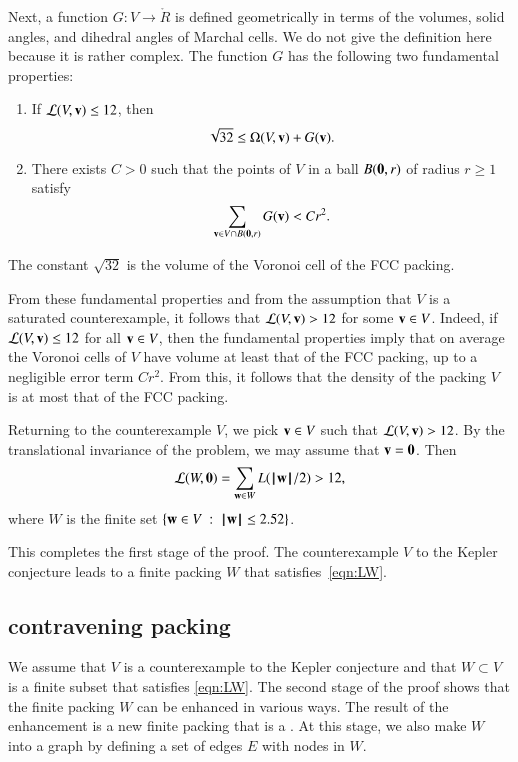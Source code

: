 Next, a function $G:V\to \ring{R}$ is defined geometrically in terms
of the volumes, solid angles, and dihedral angles of Marchal cells.
We do not give the definition here because it is rather
complex.  The function $G$ has the following two fundamental
properties:
\begin{enumerate}
\item If ${\mathcal L}(V,{\mathbf v})\le 12$, then 
\[
\sqrt{32}\le \Omega(V,{\mathbf v}) +G({\mathbf v}).
\]
\item There exists $C>0$ such that the points of $V$ in a ball $B({\mathbf 0},r)$
of radius $r\ge 1$ satisfy
\[
\sum_{{\mathbf v}\in V \cap B({\mathbf 0},r)} G({\mathbf v}) < C r^2.
\]
\end{enumerate}
The constant $\sqrt{32}$ is the volume of the Voronoi cell of the FCC packing.

From these fundamental properties and from the assumption that $V$ is a saturated counterexample,
it follows that ${\mathcal L}(V,{\mathbf v})>12$ for some ${\mathbf v}\in V$.  Indeed, if ${\mathcal L}(V,{\mathbf v})\le 12$ for all
${\mathbf v}\in V$, then the fundamental properties
imply that on average the Voronoi cells of $V$ have volume at least that of the FCC packing, up to a negligible error term $C r^2$.  From this, it follows that the density
of the packing $V$ is at most that of the FCC packing.



Returning to the counterexample $V$, we pick ${\mathbf v}\in V$ such that
${\mathcal L}(V,{\mathbf v})>12$.  By the translational invariance of the problem, we
may assume that ${\mathbf v}={\mathbf 0}$.  Then
\begin{equation}\label{eqn:LW}
{\mathcal L}(W,{\mathbf 0}) = \sum_{{\mathbf w}\in W} L({{\hskip0.1em|\hskip-0.15em|\hskip0.1em}{\mathbf w}{\hskip0.1em|\hskip-0.15em|\hskip0.1em}}/2)  > 12,
\end{equation}
where $W$ is the finite set  $\{{\mathbf w}\in V\ :\  {{\hskip0.1em|\hskip-0.15em|\hskip0.1em}{\mathbf w}{\hskip0.1em|\hskip-0.15em|\hskip0.1em}} \le 2.52\}$.

This completes the first stage of the proof.
The counterexample $V$ to the Kepler conjecture leads to a finite packing $W$
that satisfies~\eqref{eqn:LW}.

\subsection{contravening packing}

We assume that $V$ is a counterexample to the Kepler conjecture and that $W\subset V$
is a finite subset that satisfies \eqref{eqn:LW}.
The second stage of the proof shows that the 
finite packing $W$ can be enhanced in various ways.  The result of the enhancement is
a new finite packing that is a .  At this stage, we also
make $W$ into a graph by defining a set of edges $E$ with nodes in $W$.

